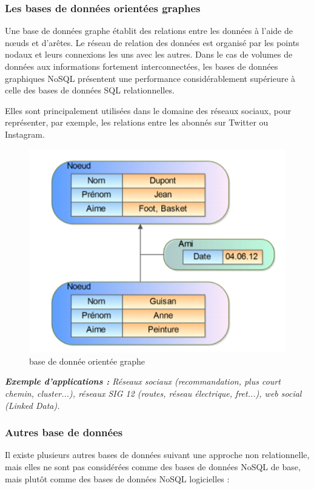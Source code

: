 \subsubsection{Les bases de données orientées graphes}
Une base de données graphe établit des relations entre les données à l'aide de nœuds et d'arêtes. Le réseau de relation des données est organisé par les points nodaux et leurs connexions les uns avec les autres. Dans le cas de volumes de données aux informations fortement interconnectées, les bases de données graphiques NoSQL présentent une performance considérablement supérieure à celle des bases de données SQL relationnelles. 

Elles sont principalement utilisées dans le domaine des réseaux sociaux, pour représenter, par exemple, les relations entre les abonnés sur Twitter ou Instagram.

\begin{figure}[h]
	\centering
    \includegraphics[scale=0.5]{img/part1/4.6}
    \caption{base de donnée orientée graphe}
\end{figure}

\textit{\textbf{Exemple d'applications :} Réseaux sociaux (recommandation, plus court chemin, cluster...), réseaux SIG 12 (routes, réseau électrique, fret...), web social (Linked Data).}

\subsubsection{Autres base de données}
Il existe plusieurs autres bases de données suivant une approche non relationnelle, mais elles ne sont pas considérées comme des bases de données NoSQL de base, mais plutôt comme des bases de données NoSQL logicielles :

